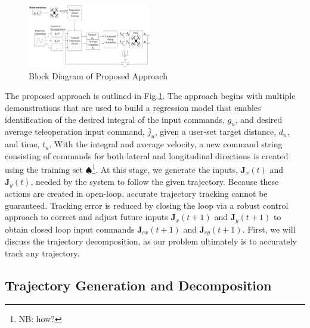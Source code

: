 \documentclass[letterpaper, 10 pt, conference]{ieeeconf}  %
\newcommand\NB[1]{$\spadesuit$\footnote{NB: #1}}
\begin{document}
\begin{figure}[ht]
    \includegraphics[width=0.48\textwidth]{images/blocks.PNG}
    \caption{Block Diagram of Proposed Approach}
    \label{fig:blockdiagram}
\end{figure}


The proposed approach is outlined in Fig.\ref{fig:blockdiagram}. The approach begins with multiple demonstrations that are used to build a regression model that enables identification of the desired integral of the input commands, $g_u$, and desired average teleoperation input command, $\bar{j}_u$, given a user-set target distance, $d_u$, and time, $t_u$. With the integral and average velocity, a new command string consisting of commands for both lateral and longitudinal directions is created using the training set \NB{how?}. At this stage, we generate the inputs, $\mathbf{J}_x(t)$ and $\mathbf{J}_y(t)$, needed by the system to follow the given trajectory. Because these actions are created in open-loop, accurate trajectory tracking cannot be guaranteed. Tracking error is reduced by closing the loop via a robust control approach to correct and adjust future inputs $\mathbf{J}_x(t+1)$ and $\mathbf{J}_y(t+1)$ to obtain closed loop input commands $\mathbf{J}_{cx}(t+1)$ and $\mathbf{J}_{cy}(t+1)$. First, we will discuss the trajectory decomposition, as our problem ultimately is to accurately track any trajectory.


\subsection{Trajectory Generation and Decomposition} \label{sec:traj}
\end{document}

